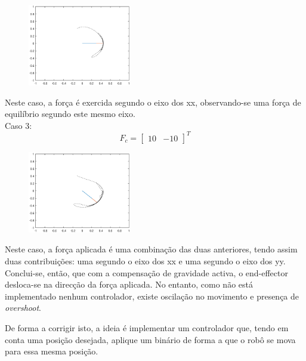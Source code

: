 \documentclass[a4paper,twocolumn,final,11pt]{article}
\begin{document}
\begin{figure}[H]
	\centering
	\includegraphics[width=0.4\textwidth]{6_f_10_0.eps}
	\caption{}
  \label{}
\end{figure}

Neste caso, a força é exercida segundo o eixo dos xx, observando-se uma força de equilíbrio segundo este mesmo eixo.
\\

Caso 3: \begin{equation} F_c = \begin{bmatrix}
10 & -10
\end{bmatrix}
^{T}
\end{equation}

\begin{figure}[H]
	\centering
	\includegraphics[width=0.4\textwidth]{6_f_10_menos10.eps}
	\caption{}
  \label{}
\end{figure}

Neste caso, a força aplicada é uma combinação das duas anteriores, tendo assim duas contribuições: uma segundo o eixo dos xx e uma segundo o eixo dos yy. 
\\

Conclui-se, então, que com a compensação de gravidade activa, o end-effector desloca-se na direcção da força aplicada. No entanto, como não está implementado nenhum controlador, existe oscilação no movimento e presença de \textit{overshoot}.

De forma a corrigir isto, a ideia é implementar um controlador que, tendo em conta uma posição desejada, aplique um binário de forma a que o robô se mova para essa mesma posição.
\end{document}
